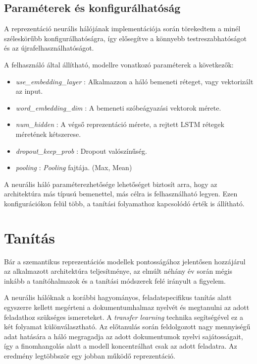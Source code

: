 \subsection{Paraméterek és konfigurálhatóság}

A reprezentáció neurális hálójának implementációja során törekedtem a minél széleskörűbb konfigurálhatóságra, így elősegítve a könnyebb testreszabhatóságot és az újrafelhasználhatóságot. 

A felhasználó által állítható, modellre vonatkozó paraméterek a következők:
\begin{itemize}
	\item \textit{use\_embedding\_layer} : Alkalmazzon a háló bemeneti réteget, vagy vektorizált az input.
	\item \textit{word\_embedding\_dim} : A bemeneti szóbeágyazási vektorok mérete.
	\item \textit{num\_hidden} : A végső reprezentáció mérete, a rejtett LSTM rétegek méretének kétszerese.
	\item \textit{dropout\_keep\_prob} : Dropout valószínűség.
	\item \textit{pooling} : \textit{Pooling} fajtája. (Max, Mean)	
\end{itemize}

A neurális háló paraméterezhetősége lehetőséget biztosít arra, hogy az architektúra más típusú bemenettel, más célra is felhasználható legyen. Ezen konfigurációkon felül több, a tanítási folyamathoz kapcsolódó érték is állítható.

\section{Tanítás}

Bár a szemantikus reprezentációs modellek pontosságához jelentősen hozzájárul az alkalmazott architektúra teljesítménye, az elmúlt néhány év során mégis inkább a tanítóhalmazok és a tanítási módszerek felé irányult a figyelem.

A neurális hálóknak a korábbi hagyományos, feladatspecifikus tanítás alatt egyszerre kellett megérteni a dokumentumhalmaz nyelvét és megtanulni az adott feladathoz szükséges ismereteket. A \textit{transfer learning} technika segítségével ez a két folyamat különválasztható. Az előtanulás során feldolgozott nagy mennyiségű adat hatására a háló megragadja az adott dokumentumok nyelvi sajátosságait, így a finomhangolás alatt a modell koncentrálhat csak az adott feladatra. Az eredmény legtöbbször egy jobban működő reprezentáció.

